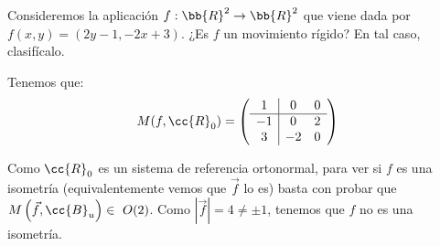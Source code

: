 \begin{ejercicio}
    Consideremos la aplicación $f : \bb{R}^2 \to \bb{R}^2$ que viene dada por $f(x, y) = (2y - 1, -2x + 3)$. ¿Es $f$ un movimiento rígido? En tal caso, clasifícalo.

    Tenemos que:
    \begin{equation*}
        M(f,\cc{R}_0) = \left(
        \begin{array}{c|cc}
            1 & 0 & 0 \\ \hline
            -1 & 0 & 2 \\
            3 & -2 & 0 \\
        \end{array}
        \right)
    \end{equation*}

    Como $\cc{R}_0$ es un sistema de referencia ortonormal, para ver si $f$ es una isometría (equivalentemente vemos que $\vec{f}$ lo es) basta con probar que
    $M\left(\vec{f}, \cc{B}_u\right)\in~O(2)$. Como $\left|\vec{f}\right|=4\neq \pm 1$, tenemos que $f$ no es una isometría.
\end{ejercicio}

